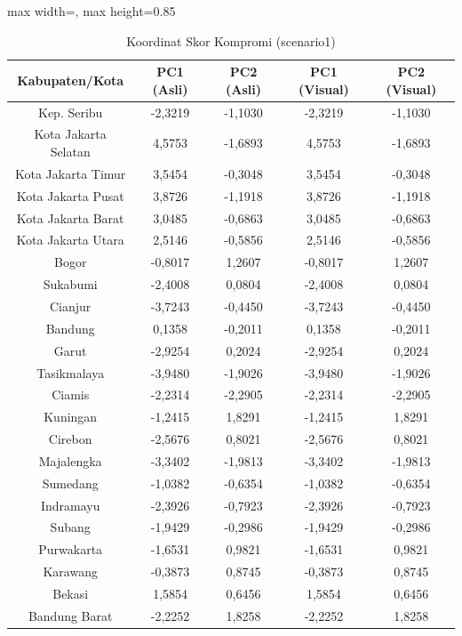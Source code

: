 \begin{table}[H]
\centering
\caption{Koordinat Skor Kompromi (scenario1)} \label{tab:app1scores}
\begin{adjustbox}{max width=\textwidth, max height=0.85\textheight}
\begin{tabular}{|c|c|c|c|c|}
\hline
\textbf{Kabupaten/Kota} & \textbf{PC1 (Asli)} & \textbf{PC2 (Asli)} & \textbf{PC1 (Visual)} & \textbf{PC2 (Visual)} \\
\hline
Kep. Seribu & -2,3219 & -1,1030 & -2,3219 & -1,1030 \\
Kota Jakarta Selatan & 4,5753 & -1,6893 & 4,5753 & -1,6893 \\
Kota Jakarta Timur & 3,5454 & -0,3048 & 3,5454 & -0,3048 \\
Kota Jakarta Pusat & 3,8726 & -1,1918 & 3,8726 & -1,1918 \\
Kota Jakarta Barat & 3,0485 & -0,6863 & 3,0485 & -0,6863 \\
Kota Jakarta Utara & 2,5146 & -0,5856 & 2,5146 & -0,5856 \\
Bogor & -0,8017 & 1,2607 & -0,8017 & 1,2607 \\
Sukabumi & -2,4008 & 0,0804 & -2,4008 & 0,0804 \\
Cianjur & -3,7243 & -0,4450 & -3,7243 & -0,4450 \\
Bandung & 0,1358 & -0,2011 & 0,1358 & -0,2011 \\
Garut & -2,9254 & 0,2024 & -2,9254 & 0,2024 \\
Tasikmalaya & -3,9480 & -1,9026 & -3,9480 & -1,9026 \\
Ciamis & -2,2314 & -2,2905 & -2,2314 & -2,2905 \\
Kuningan & -1,2415 & 1,8291 & -1,2415 & 1,8291 \\
Cirebon & -2,5676 & 0,8021 & -2,5676 & 0,8021 \\
Majalengka & -3,3402 & -1,9813 & -3,3402 & -1,9813 \\
Sumedang & -1,0382 & -0,6354 & -1,0382 & -0,6354 \\
Indramayu & -2,3926 & -0,7923 & -2,3926 & -0,7923 \\
Subang & -1,9429 & -0,2986 & -1,9429 & -0,2986 \\
Purwakarta & -1,6531 & 0,9821 & -1,6531 & 0,9821 \\
Karawang & -0,3873 & 0,8745 & -0,3873 & 0,8745 \\
Bekasi & 1,5854 & 0,6456 & 1,5854 & 0,6456 \\
Bandung Barat & -2,2252 & 1,8258 & -2,2252 & 1,8258 \\

\end{tabular}
\end{adjustbox}
\end{table}
